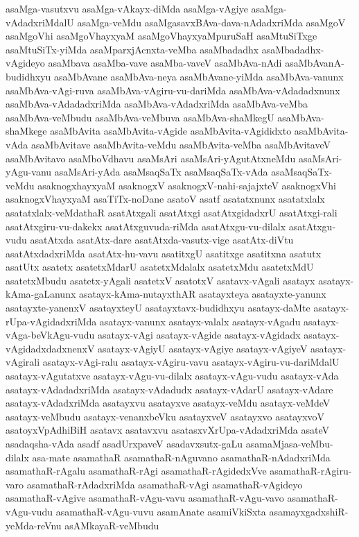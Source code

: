 {asaMga-vasutxvu
asaMga-vAkayx-diMda
asaMga-vAgiye
asaMga-vAdadxriMdalU
asaMga-veMdu
asaMgasavxBAva-dava-nAdadxriMda
asaMgoV
asaMgoVhi
asaMgoVhayxyaM
asaMgoVhayxyaMpuruSaH
asaMtuSiTxge
asaMtuSiTx-yiMda
asaMparxjAcnxta-veMba
asaMbadadhx
asaMbadadhx-vAgideyo
asaMbava
asaMba-vave
asaMba-vaveV
asaMbAva-nAdi
asaMbAvanA-budidhxyu
asaMbAvane
asaMbAva-neya
asaMbAvane-yiMda
asaMbAva-vanunx
asaMbAva-vAgi-ruva
asaMbAva-vAgiru-vu-dariMda
asaMbAva-vAdadadxnunx
asaMbAva-vAdadadxriMda
asaMbAva-vAdadxriMda
asaMbAva-veMba
asaMbAva-veMbudu
asaMbAva-veMbuva
asaMbAva-shaMkegU
asaMbAva-shaMkege
asaMbAvita
asaMbAvita-vAgide
asaMbAvita-vAgididxto
asaMbAvita-vAda
asaMbAvitave
asaMbAvita-veMdu
asaMbAvita-veMba
asaMbAvitaveV
asaMbAvitavo
asaMboVdhavu
asaMsAri
asaMsAri-yAgutAtxneMdu
asaMsAri-yAgu-vanu
asaMsAri-yAda
asaMsaqSaTx
asaMsaqSaTx-vAda
asaMsaqSaTx-veMdu
asaknogxhayxyaM
asaknogxV
asaknogxV-nahi-sajajxteV
asaknogxVhi
asaknogxVhayxyaM
asaTiTx-noDane
asatoV
asatf
asatatxnunx
asatatxlalx
asatatxlalx-veMdathaR
asatAtxgali
asatAtxgi
asatAtxgidadxrU
asatAtxgi-rali
asatAtxgiru-vu-dakekx
asatAtxguvuda-riMda
asatAtxgu-vu-dilalx
asatAtxgu-vudu
asatAtxda
asatAtx-dare
asatAtxda-vasutx-vige
asatAtx-diVtu
asatAtxdadxriMda
asatAtx-hu-vavu
asatitxgU
asatitxge
asatitxna
asatutx
asatUtx
asatetx
asatetxMdarU
asatetxMdalalx
asatetxMdu
asatetxMdU
asatetxMbudu
asatetx-yAgali
asatetxV
asatotxV
asatavx-vAgali
asatayx
asatayx-kAma-gaLanunx
asatayx-kAma-nutayxthAR
asatayxteya
asatayxte-yanunx
asatayxte-yanenxV
asatayxteyU
asatayxtavx-budidhxyu
asatayx-daMte
asatayx-rUpa-vAgidadxriMda
asatayx-vanunx
asatayx-valalx
asatayx-vAgadu
asatayx-vAga-beVkAgu-vudu
asatayx-vAgi
asatayx-vAgide
asatayx-vAgidadx
asatayx-vAgidadxdadxnenxV
asatayx-vAgiyU
asatayx-vAgiye
asatayx-vAgiyeV
asatayx-vAgirali
asatayx-vAgi-ralu
asatayx-vAgiru-vavu
asatayx-vAgiru-vu-dariMdalU
asatayx-vAgutatxve
asatayx-vAgu-vu-dilalx
asatayx-vAgu-vudu
asatayx-vAda
asatayx-vAdadadxriMda
asatayx-vAdadudx
asatayx-vAdarU
asatayx-vAdare
asatayx-vAdadxriMda
asatayxvu
asatayxve
asatayx-veMdu
asatayx-veMdeV
asatayx-veMbudu
asatayx-venanxbeVku
asatayxveV
asatayxvo
asatayxvoV
asatoyxVpAdhiBiH
asatavx
asatavxvu
asatasxvXrUpa-vAdadxriMda
asateV
asadaqsha-vAda
asadf
asadUrxpaveV
asadavxsutx-gaLu
asamaMjasa-veMbu-dilalx
asa-mate
asamathaR
asamathaR-nAguvano
asamathaR-nAdadxriMda
asamathaR-rAgalu
asamathaR-rAgi
asamathaR-rAgidedxVve
asamathaR-rAgiru-varo
asamathaR-rAdadxriMda
asamathaR-vAgi
asamathaR-vAgideyo
asamathaR-vAgive
asamathaR-vAgu-vavu
asamathaR-vAgu-vavo
asamathaR-vAgu-vudu
asamathaR-vAgu-vuvu
asamAnate
asamiVkiSxta
asamayxgadxshiR-yeMda-reVnu
asAMkayaR-veMbudu
}
